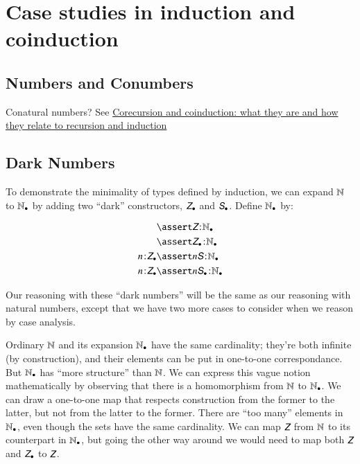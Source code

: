 \section{Case studies in induction and coinduction}\label{sec:case_studies}

\subsection{Numbers and Conumbers}

Conatural numbers? See
\href{https://www.cl.cam.ac.uk/archive/mjcg/plans/Coinduction.pdf}{Corecursion
  and coinduction: what they are and how they relate to recursion and
  induction}

\subsection{Dark Numbers}

To demonstrate the minimality of types defined by induction, we can
expand \(\mathbb{N}\) to \(\mathbb{N}_{\bullet}\) by adding two ``dark'' constructors,
\(\ZDark\) and \(\SDark\). Define \(\mathbb{N}_{\bullet}\) by:

\begin{align}
  & \linfer \tj{\ZNat}{\NDark} \\
  & \linfer \tj{\ZDark}{\NDark} \\
  \tj{n}{\ZDark} & \linfer \tj{n\SNat}{\NDark} \\
  \tj{n}{\ZDark} & \linfer \tj{n\SDark}{\NDark} \\
\end{align}

Our reasoning with these ``dark numbers'' will be the same as our
reasoning with natural numbers, except that we have two more cases to
consider when we reason by case analysis.

Ordinary \(\mathbb{N}\) and its expansion \(\mathbb{N}_{\bullet}\) have the same
cardinality; they're both infinite (by construction), and their
elements can be put in one-to-one correspondance. But \(\mathbb{N}_{\bullet}\) has
``more structure'' than \(\mathbb{N}\). We can express this vague notion
mathematically by observing that there is a homomorphism from \(\mathbb{N}\)
to \(\mathbb{N}_{\bullet}\). We can draw a one-to-one map that respects construction
from the former to the latter, but not from the latter to the former.
There are ``too many'' elements in \(\mathbb{N}_{\bullet}\), even though the sets
have the same cardinality. We can map \(\ZNat\) from \(\mathbb{N}\) to its
counterpart in \(\mathbb{N}_{\bullet}\), but going the other way around we would
need to map both \(\ZNat\) and \(\ZDark\) to \(\ZNat\).

